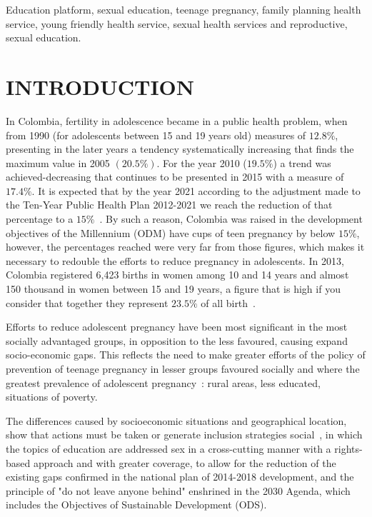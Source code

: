 \documentclass[journal,transmag]{IEEEtran}
\begin{document}
\begin{IEEEkeywords}
Education platform, sexual education, teenage pregnancy, family planning health service, young friendly health service, sexual health services and reproductive, sexual education.
\end{IEEEkeywords}

\IEEEpeerreviewmaketitle

\section{INTRODUCTION}

In Colombia, fertility in adolescence became in a public health problem, when from 1990 (for adolescents between 15 and 19 years old) measures of $12.8\%$, presenting in the later years a tendency systematically increasing that finds the maximum value in 2005 $(20.5\%)$. For the year 2010 ($19.5\%$) a trend was achieved-decreasing that continues to be presented in 2015 with a measure of $17.4\%$. It is expected that by the year 2021 according to the adjustment made to the Ten-Year Public Health Plan 2012-2021 we reach the reduction of that percentage to a $15\%$~\cite{Pro2015}. By such a reason, Colombia was raised in the development objectives of the Millennium (ODM) have cups of teen pregnancy by below $15\%$, however, the percentages reached were very far from those figures, which makes it necessary to redouble the efforts to reduce pregnancy in adolescents. In 2013, Colombia registered 6,423 births in women among 10 and 14 years and almost 150 thousand in women between 15 and 19 years, a figure that is high if you consider that together they represent $23.5\%$ of all birth~\cite{PNUD2015}.

Efforts to reduce adolescent pregnancy have been most significant in the most socially advantaged groups, in opposition to the less favoured, causing expand socio-economic gaps. This reflects the need to make greater efforts of the policy of prevention of teenage pregnancy in lesser groups favoured socially and where the greatest prevalence of adolescent pregnancy~\cite{Pro2015, Pro2015II}: rural areas, less educated, situations of poverty.

The differences caused by socioeconomic situations and geographical location, show that actions must be taken or generate inclusion strategies social~\cite{BID2017}, in which the topics of education are addressed sex in a cross-cutting manner with a rights-based approach and with greater coverage, to allow for the reduction of the existing gaps confirmed in the national plan of 2014-2018 development, and the principle of "do not leave anyone behind" enshrined in the 2030 Agenda, which includes the Objectives of Sustainable Development (ODS).
\end{document}
